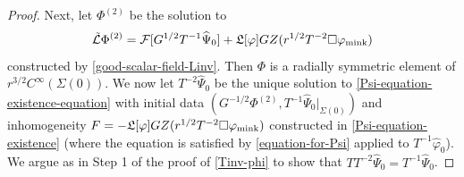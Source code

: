 \documentclass[10pt, reqno]{amsart}
\begin{document}
\begin{proof}
Next, let \(\Phi^{(2)}\) be the solution to
\begin{equation}\label{LPsi-RHS}
\tilde{\mathcal{L}}\Phi^{(2)} = \mathcal{F}[G^{1/2}T^{-1}\widehat{\Psi{}}_0] + \mathfrak{L}[\varphi{}]GZ(r^{1/2}T^{-2}\Box{}\varphi{}_{\textnormal{mink}})
\end{equation}
constructed by \cref{good-scalar-field-Linv}. Then \(\Phi{}\) is a radially symmetric element
of \(r^{3/2}C^\infty(\Sigma{}(0))\). We now let \(T^{-2}\widehat{\Psi{}}_0\) be
the unique solution to \cref{Psi-equation-existence-equation} with initial data
\((G^{-1/2}\Phi^{(2)},T^{-1}\widehat{\Psi{}}_0|_{\Sigma{}(0)})\) and
inhomogeneity \(F =
-\mathfrak{L}[\varphi{}]GZ(r^{1/2}T^{-2}\Box{}\varphi{}_{\textnormal{mink}})\)
constructed in \cref{Psi-equation-existence} (where the equation is satisfied by
\cref{equation-for-Psi} applied to \(T^{-1}\widehat{\varphi{}}_0\)). We argue as in
Step 1 of the proof of \cref{Tinv-phi} to show that \(TT^{-2}\widehat{\Psi{}}_0 =
T^{-1}\widehat{\Psi{}}_0\).


\end{proof}
\end{document}
